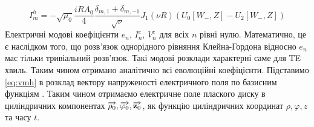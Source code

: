 %
%
%
%
\begin{equation} \label{eq:imh}
I_{m}^{h} = - \sqrt{\mu_0} \frac{iR A_0}{4} 
\frac{\delta_{m,1} + \delta_{m,-1}}{\sqrt{\nu}} 
J_1 (\nu R) \left( U_0 [ W_-, Z ] - U_2 [ W_-, Z ] \right)
\end{equation}
%
Електричні модові коефіцієнти $ e_n $, $ I_n^e $, $ V_n^e $ для всіх $ n $
рівні нулю. Математично, це є наслідком того, що розв'язок однорідного рівняння 
Клейна-Гордона відносно $ e_n $ має тільки тривіальний розв'язок. Такі модові
розклади характерні саме для TE хвиль.
%
Таким чином отримано аналітично всі еволюційні коефіцієнти. Підставимо
\eqref{eq:vmh} в розклад вектору напруженості електричного поля по
базисним функціям \cite{imp:Dumin2010}. Таким чином отримаємо електричне 
поле плаского диску в циліндричних компонентах 
$ \overrightarrow{\mathbf \rho_0}, \overrightarrow{\mathbf \varphi_0}, \overrightarrow{\mathbf z_0} $, як функцію циліндричних 
координат $ \rho, \varphi, z $ та часу $ t $.
%
